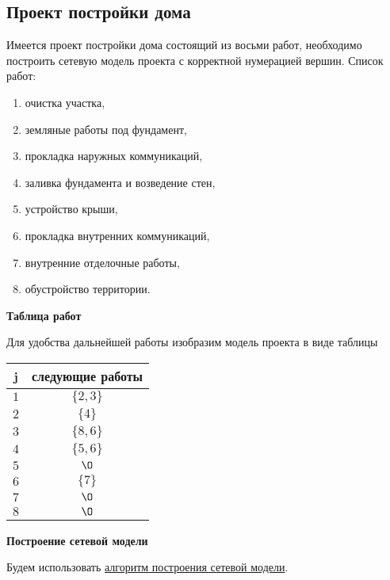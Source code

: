 \subsection{Проект постройки дома}\label{proj:house_building_project}


Имеется проект постройки дома состоящий из восьми работ, необходимо построить сетевую модель проекта с корректной нумерацией вершин. Список работ:

\begin{enumerate}[nosep]
	\item очистка участка,
	\item земляные работы под фундамент,
	\item прокладка наружных коммуникаций,
	\item заливка фундамента и возведение стен,
	\item устройство крыши,
	\item прокладка внутренних коммуникаций,
	\item внутренние отделочные работы,
	\item обустройство территории.
\end{enumerate}

\solution

\textbf{Таблица работ}

Для удобства дальнейшей работы изобразим модель проекта в виде таблицы

\begin{table}[H]
	\centering
	\begin{tabular}{ | c | c | } 
		\hline
		j & следующие работы \\\hline
		$1$ & $\{2,3\}$ \\\hline
		$2$ & $\{4\}$ \\\hline
		$3$ & $\{8,6\}$ \\\hline
		$4$ & $\{5,6\}$ \\\hline
		$5$ & $\O$ \\\hline
		$6$ & $\{7\}$ \\\hline
		$7$ & $\O$ \\\hline
		$8$ & $\O$ \\\hline
	\end{tabular}
\end{table}

\bigskip

\textbf{Построение сетевой модели}

Будем использовать \hyperref[alg:building_network_model]{алгоритм построения сетевой модели}.

